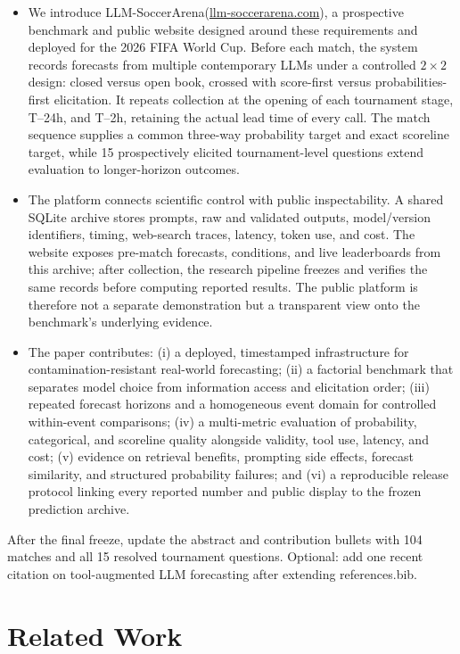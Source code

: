 \documentclass[sigconf,review]{acmart}
\newcommand{\arena}{\mbox{LLM-SoccerArena}\xspace}
\newcommand{\arenalink}{\href{https://llm-soccerarena.com}{llm-soccerarena.com}}
\newenvironment{draftbullets}
  {\begin{itemize}[leftmargin=1.25em,itemsep=1.5pt,topsep=2pt,parsep=0pt,partopsep=0pt]}
  {\end{itemize}}
\newcommand{\TODO}[1]{{\color{red}#1}}
\begin{document}
\begin{draftbullets}
  \item We introduce \arena (\arenalink), a prospective benchmark and public website designed around
  these requirements and deployed for the 2026 FIFA World Cup. Before each match, the system records
  forecasts from multiple contemporary LLMs under a controlled $2\times2$ design: closed versus open
  book, crossed with score-first versus probabilities-first elicitation. It repeats collection at the
  opening of each tournament stage, T--24h, and T--2h, retaining the actual lead time of every call.
  The match sequence supplies a common three-way probability target and exact scoreline target, while
  15 prospectively elicited tournament-level questions extend evaluation to longer-horizon outcomes.

  \item The platform connects scientific control with public inspectability. A shared SQLite archive
  stores prompts, raw and validated outputs, model/version identifiers, timing, web-search traces,
  latency, token use, and cost. The website exposes pre-match forecasts, conditions, and live
  leaderboards from this archive; after collection, the research pipeline freezes and verifies the
  same records before computing reported results. The public platform is therefore not a separate
  demonstration but a transparent view onto the benchmark's underlying evidence.

  \item The paper contributes: (i) a deployed, timestamped infrastructure for contamination-resistant
  real-world forecasting; (ii) a factorial benchmark that separates model choice from information
  access and elicitation order; (iii) repeated forecast horizons and a homogeneous event domain for
  controlled within-event comparisons; (iv) a multi-metric evaluation of probability, categorical,
  and scoreline quality alongside validity, tool use, latency, and cost; (v) evidence on retrieval
  benefits, prompting side effects, forecast similarity, and structured probability failures; and
  (vi) a reproducible release protocol linking every reported number and public display to the frozen
  prediction archive.
\end{draftbullets}

\TODO{After the final freeze, update the abstract and contribution bullets with 104 matches and all 15 resolved tournament questions. Optional: add one recent citation on tool-augmented LLM forecasting after extending references.bib.}

\section{Related Work}
\end{document}
